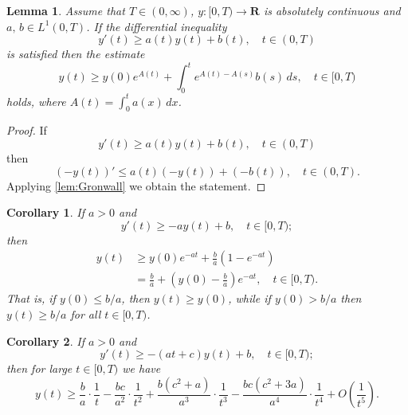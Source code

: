 \documentclass[pdflatex,sn-mathphys-num]{sn-jnl}
\theoremstyle{thmstyleone}
\newtheorem{lemma}{Lemma}[section]
\newtheorem{corollary}{Corollary}[section]
\theoremstyle{thmstyletwo}
\theoremstyle{thmstylethree}
\begin{document}
\begin{lemma}\label{lem:reverse Gronwall}
Assume that $T\in(0,\infty)$, $y:[0,T)\to\mathbf{R}$ is absolutely 
continuous and $a,\,b\in L^1(0,T)$. If the differential inequality 
\begin{equation}
y'(t)\geq a(t)y(t)+b(t),\quad t\in (0,T)
\end{equation}
is satisfied then the estimate
\begin{equation}
y(t)\geq y(0)e^{A(t)}+\int_0^t e^{A(t)-A(s)}b(s)\,ds, \quad t\in[0,T)
\end{equation}
holds, where $A(t)=\int_0^t a(x)\,dx$.
\end{lemma}
\begin{proof}
If 
\begin{equation}
y'(t)\geq a(t)y(t)+b(t),\quad t\in (0,T)
\end{equation}
then
\begin{equation}
(-y(t))'\leq a(t)(-y(t))+(-b(t)),\quad t\in (0,T).
\end{equation}
Applying \autoref{lem:Gronwall} we obtain the statement.
\end{proof}

\begin{corollary}\label{cor:reversediffineq_cor}
If $a>0$ and 
\begin{equation*}
y'(t)\geq -ay(t)+b, \quad t\in[0,T);
\end{equation*}
then
\begin{align*}
y(t) &\geq y(0)e^{-at}+\frac{b}{a}\left(1-e^{-at} \right) \\
&= \frac{b}{a}+\left(y(0)-\frac{b}{a} \right)e^{-at}, \quad t\in[0,T).
\end{align*}
That is, if $y(0)\leq b/a$, then $y(t)\geq y(0)$, while if $y(0)>b/a$ 
then $y(t)\geq b/a$ for all $t\in [0,T)$.
\end{corollary}

\begin{corollary}\label{cor:lower_diff_ineq}
If $a>0$ and 
\begin{equation}
y'(t)\geq -(at+c)y(t)+b,\quad t\in[0,T);
\end{equation}
then for large $t\in[0,T)$ we have  
\begin{equation}
y(t)\geq \frac{b}{a} \cdot \frac{1}{t} - \frac{bc}{a^2} \cdot \frac{1}{t^2} + \frac{b(c^2 + a)}
{a^3} \cdot \frac{1}{t^3} - \frac{bc(c^2 + 3a)}{a^4} \cdot \frac{1}{t^4} + O\left(\frac{1}
{t^5}\right).
\end{equation}
\end{corollary}
\end{document}
